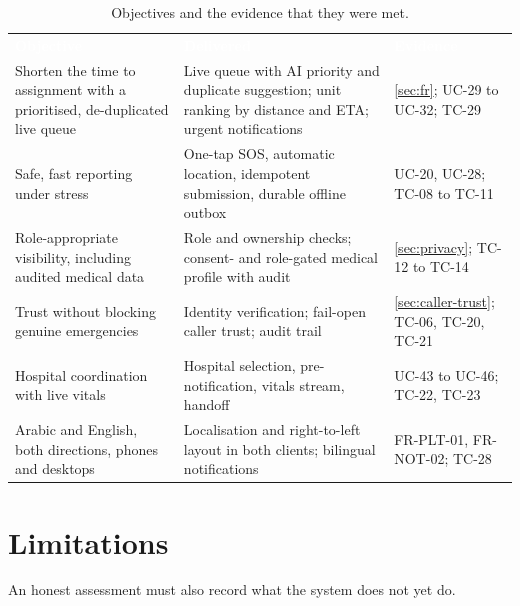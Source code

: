 \begin{table}[!htbp]
\caption{Objectives and the evidence that they were met.}\label{tab:objectives}
\centering\tabfont\rowband
\begin{tabular}{@{}>{\raggedright\arraybackslash}p{4.3cm}>{\raggedright\arraybackslash}p{6.4cm}>{\raggedright\arraybackslash}p{3.5cm}@{}}
\rowcolor{najdanavy}\textcolor{white}{\sffamily\bfseries\small Objective} & \textcolor{white}{\sffamily\bfseries\small Delivered} & \textcolor{white}{\sffamily\bfseries\small Evidence} \\
Shorten the time to assignment with a prioritised, de-duplicated live queue & Live queue with AI priority and duplicate suggestion; unit ranking by distance and ETA; urgent notifications & \cref{sec:fr}; UC-29 to UC-32; TC-29 \\
Safe, fast reporting under stress & One-tap SOS, automatic location, idempotent submission, durable offline outbox & UC-20, UC-28; TC-08 to TC-11 \\
Role-appropriate visibility, including audited medical data & Role and ownership checks; consent- and role-gated medical profile with audit & \cref{sec:privacy}; TC-12 to TC-14 \\
Trust without blocking genuine emergencies & Identity verification; fail-open caller trust; audit trail & \cref{sec:caller-trust}; TC-06, TC-20, TC-21 \\
Hospital coordination with live vitals & Hospital selection, pre-notification, vitals stream, handoff & UC-43 to UC-46; TC-22, TC-23 \\
Arabic and English, both directions, phones and desktops & Localisation and right-to-left layout in both clients; bilingual notifications & FR-PLT-01, FR-NOT-02; TC-28 \\
\end{tabular}
\end{table}

\section{Limitations}

An honest assessment must also record what the system does not yet do.

